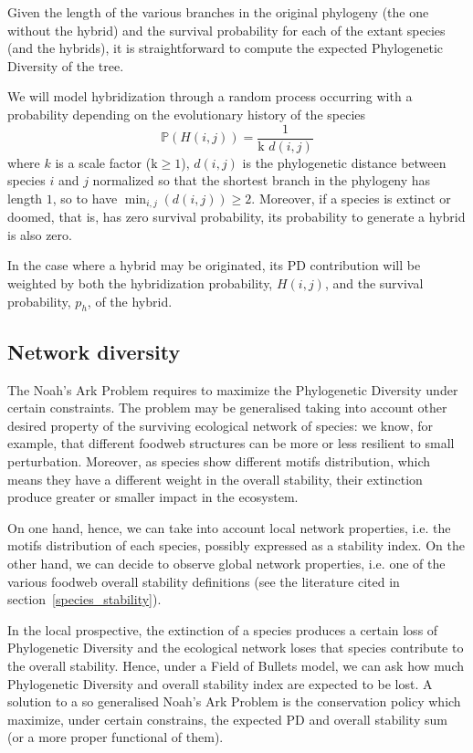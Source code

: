 \documentclass[12pt,a4paper]{report}
\begin{document}
Given the length of the various branches in the original phylogeny (the one without the hybrid) and the survival probability for each of the extant species (and the hybrids), it is straightforward to compute the expected Phylogenetic Diversity of the tree.

We will model hybridization through a random process occurring with a probability depending on the evolutionary history of the species \[\mathbb{P}(H(i,j))=\frac{1}{\mbox{k } d(i,j)}\] where $k$ is a scale factor ($\mbox{k}\geq 1$), $d(i,j)$ is the phylogenetic distance between species $i$ and $j$ normalized so that the shortest branch in the phylogeny has length $1$, so to have $\min_{i,j}(d(i,j)) \geq 2$. Moreover, if a species is extinct or doomed, that is, has zero survival probability, its probability to generate a hybrid is also zero.

In the case where a hybrid may be originated, its PD contribution will be weighted by both the hybridization probability, $H(i,j)$, and the survival probability, $p_h$, of the hybrid.

\subsection{Network diversity}\label{network_diversity}

The Noah's Ark Problem requires to maximize the Phylogenetic Diversity under certain constraints. The problem may be generalised taking into account other desired property of the surviving ecological network of species: we know, for example, that different foodweb structures can be more or less resilient to small perturbation. Moreover, as species show different motifs distribution, which means they have a different weight in the overall stability, their extinction produce greater or smaller impact in the ecosystem.

On one hand, hence, we can take into account local network properties, i.e. the motifs distribution of each species, possibly expressed as a stability index. On the other hand, we can decide to observe global network properties, i.e. one of the various foodweb overall stability definitions (see the literature cited in section~\ref{species_stability}).

In the local prospective, the extinction of a species produces a certain loss of Phylogenetic Diversity and the ecological network loses that species contribute to the overall stability. Hence, under a Field of Bullets model, we can ask how much Phylogenetic Diversity and overall stability index are expected to be lost. A solution to a so generalised Noah's Ark Problem is the conservation policy which maximize, under certain constrains, the expected PD and overall stability sum (or a more proper functional of them).
\end{document}
